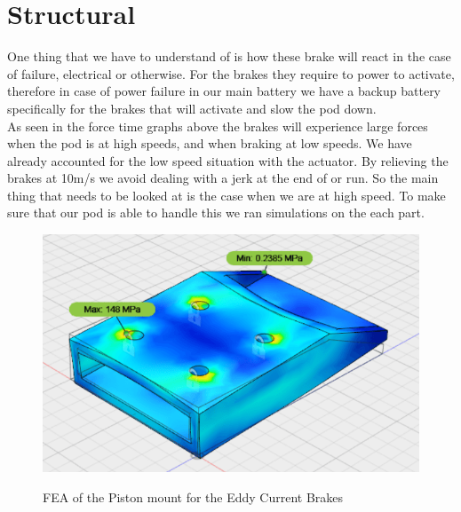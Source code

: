 \documentclass[main.tex]{subfiles}
\begin{document}
    \section{Structural}
    One thing that we have to understand of is how these brake will react in the case of failure, electrical or otherwise. For the brakes they require to power to activate, therefore in case of power failure in our main battery we have a backup battery specifically for the brakes that will activate and slow the pod down.  \\
    As seen in the force time graphs above  the brakes will experience large forces when the pod is at high speeds, and when braking at low speeds. We have already accounted for the low speed situation with the actuator. By relieving the brakes at 10m/s we avoid dealing with a jerk at the end of or run. So the main thing that needs to be looked at is the case when we are at high speed. To make sure that our pod is able to handle this we ran simulations on the each part.\\
        \begin{figure}[H]
    	\centering
        \includegraphics[width =\linewidth]{images/ECPistonMount}
        \label{fig:ECPiston}
        \caption{FEA of the Piston mount for the Eddy Current Brakes}
    \end{figure}
\end{document}
